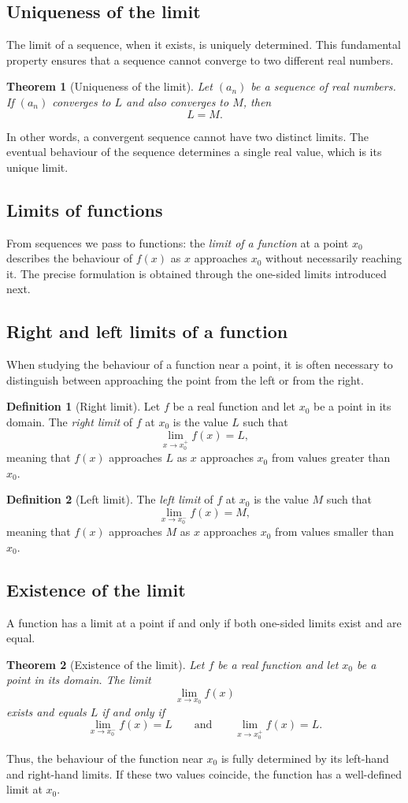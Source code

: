 \documentclass[11pt,a4paper]{article}
\theoremstyle{definition} \newtheorem{definition}{Definition} \theoremstyle{plain} \newtheorem{theorem}{Theorem}
\begin{document}
\subsection{Uniqueness of the limit}
The limit of a sequence, when it exists, is uniquely determined.
This fundamental property ensures that a sequence cannot converge to two different real numbers.
\begin{theorem}[Uniqueness of the limit]\label{thm:uniqueness-limit} Let $(a_n)$ be a sequence of real numbers.
If $(a_n)$ converges to $L$ and also converges to $M$, then
\[ L = M. \]
\end{theorem}
In other words, a convergent sequence cannot have two distinct limits.
The eventual behaviour of the sequence determines a single real value, which is its unique limit.
\subsection{Limits of functions}
From sequences we pass to functions: the \emph{limit of a function} at a point $x_0$ describes the behaviour of $f(x)$ as $x$ approaches $x_0$ without necessarily reaching it. The precise formulation is obtained through the one-sided limits introduced next.
\subsection{Right and left limits of a function}
When studying the behaviour of a function near a point, it is often necessary to distinguish between approaching the point from the left or from the right.
\begin{definition}[Right limit] Let $f$ be a real function and let $x_0$ be a point in its domain.
The \emph{right limit} of $f$ at $x_0$ is the value $L$ such that
\[ \lim_{x \to x_0^+} f(x) = L, \]
meaning that $f(x)$ approaches $L$ as $x$ approaches $x_0$ from values greater than $x_0$. \end{definition}
\begin{definition}[Left limit] The \emph{left limit} of $f$ at $x_0$ is the value $M$ such that
\[ \lim_{x \to x_0^-} f(x) = M, \]
meaning that $f(x)$ approaches $M$ as $x$ approaches $x_0$ from values smaller than $x_0$. \end{definition}
\subsection{Existence of the limit}
A function has a limit at a point if and only if both one-sided limits exist and are equal.
\begin{theorem}[Existence of the limit]\label{thm:existence-limit} Let $f$ be a real function and let $x_0$ be a point in its domain.
The limit
\[ \lim_{x \to x_0} f(x) \]
exists and equals $L$ if and only if
\[ \lim_{x \to x_0^-} f(x) = L \qquad \text{and} \qquad \lim_{x \to x_0^+} f(x) = L. \]
\end{theorem}
Thus, the behaviour of the function near $x_0$ is fully determined by its left-hand and right-hand limits.
If these two values coincide, the function has a well-defined limit at $x_0$.
\end{document}

